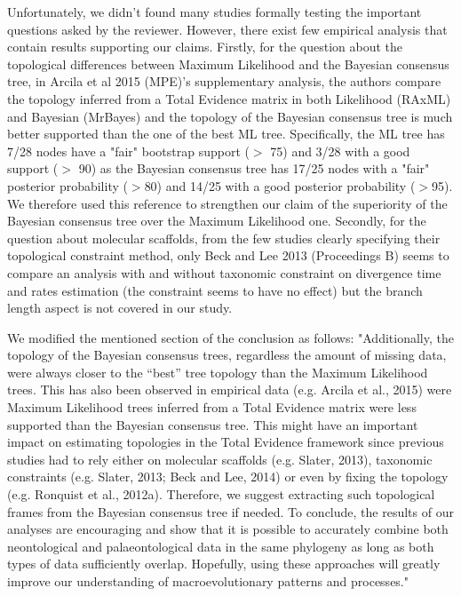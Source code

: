 \documentclass[12pt,letterpaper]{article}
\begin{document}
\begin{enumerate}
Unfortunately, we didn't found many studies formally testing the important questions asked by the reviewer. However, there exist few empirical analysis that contain results supporting our claims.
Firstly, for the question about the topological differences between Maximum Likelihood and the Bayesian consensus tree, in Arcila et al 2015 (MPE)'s supplementary analysis, the authors compare the topology inferred from a Total Evidence matrix in both Likelihood (RAxML) and Bayesian (MrBayes) and the topology of the Bayesian consensus tree is much better supported than the one of the best ML tree. Specifically, the ML tree has 7/28 nodes have a "fair" bootstrap support ($>$ 75) and 3/28 with a good support ($>$ 90) as the Bayesian consensus tree has 17/25 nodes with a "fair" posterior probability ($>$80) and 14/25 with a good posterior probability ($>$95). We therefore used this reference to strengthen our claim of the superiority of the Bayesian consensus tree over the Maximum Likelihood one.
Secondly, for the question about molecular scaffolds, from the few studies clearly specifying their topological constraint method, only Beck and Lee 2013 (Proceedings B) seems to compare an analysis with and without taxonomic constraint on divergence time and rates estimation (the constraint seems to have no effect) but the branch length aspect is not covered in our study.

We modified the mentioned section of the conclusion as follows:
"Additionally, the topology of the Bayesian consensus trees, regardless the amount of missing data, were always closer to the ``best'' tree topology than the Maximum Likelihood trees.
This has also been observed in empirical data (e.g. Arcila et al., 2015) were Maximum Likelihood trees inferred from a Total Evidence matrix were less supported than the Bayesian consensus tree.
This might have an important impact on estimating topologies in the Total Evidence framework since previous studies had to rely either on molecular scaffolds (e.g. Slater, 2013), taxonomic constraints (e.g. Slater, 2013; Beck and Lee, 2014) or even by fixing the topology (e.g. Ronquist et al., 2012a).
Therefore, we suggest extracting such topological frames from the Bayesian consensus tree if needed.
To conclude, the results of our analyses are encouraging and show that it is possible to accurately combine both neontological and palaeontological data in the same phylogeny as long as both types of data sufficiently overlap.
Hopefully, using these approaches will greatly improve our understanding of macroevolutionary patterns and processes."


\end{enumerate}
\end{document}
